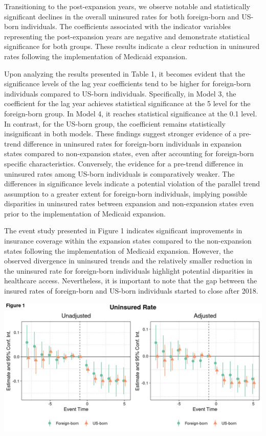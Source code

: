 \documentclass[
]{article}
\begin{document}
Transitioning to the post-expansion years, we observe notable and
statistically significant declines in the overall uninsured rates for
both foreign-born and US-born individuals. The coefficients associated
with the indicator variables representing the post-expansion years are
negative and demonstrate statistical significance for both groups. These
results indicate a clear reduction in uninsured rates following the
implementation of Medicaid expansion.

Upon analyzing the results presented in Table 1, it becomes evident that
the significance levels of the lag year coefficients tend to be higher
for foreign-born individuals compared to US-born individuals.
Specifically, in Model 3, the coefficient for the lag year achieves
statistical significance at the 5 level for the foreign-born group. In
Model 4, it reaches statistical significance at the 0.1 level. In
contrast, for the US-born group, the coefficient remains statistically
insignificant in both models. These findings suggest stronger evidence
of a pre-trend difference in uninsured rates for foreign-born
individuals in expansion states compared to non-expansion states, even
after accounting for foreign-born specific characteristics. Conversely,
the evidence for a pre-trend difference in uninsured rates among US-born
individuals is comparatively weaker. The differences in significance
levels indicate a potential violation of the parallel trend assumption
to a greater extent for foreign-born individuals, implying possible
disparities in uninsured rates between expansion and non-expansion
states even prior to the implementation of Medicaid expansion.

The event study presented in Figure 1 indicates significant improvements
in insurance coverage within the expansion states compared to the
non-expansion states following the implementation of Medicaid expansion.
However, the observed divergence in uninsured trends and the relatively
smaller reduction in the uninsured rate for foreign-born individuals
highlight potential disparities in healthcare access. Nevertheless, it
is important to note that the gap between the insured rates of
foreign-born and US-born individuals started to close after 2018.

\begin{center}\includegraphics{figures/prefix-fig1-1} \end{center}
\end{document}
